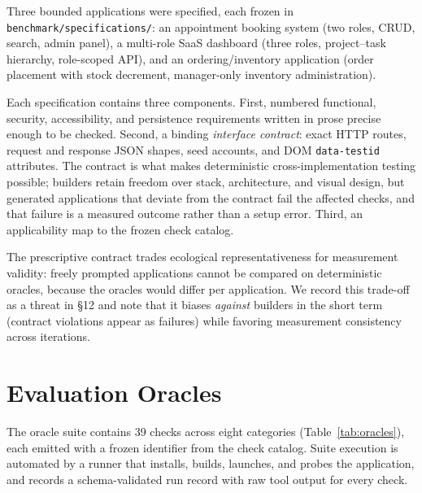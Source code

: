 Three bounded applications were specified, each frozen in
\texttt{benchmark/specifications/}: an appointment booking system (two roles, CRUD,
search, admin panel), a multi-role SaaS dashboard (three roles, project--task
hierarchy, role-scoped API), and an ordering/inventory application (order placement
with stock decrement, manager-only inventory administration).

Each specification contains three components. First, numbered functional, security,
accessibility, and persistence requirements written in prose precise enough to be
checked. Second, a binding \emph{interface contract}: exact HTTP routes, request and
response JSON shapes, seed accounts, and DOM \texttt{data-testid} attributes. The
contract is what makes deterministic cross-implementation testing possible; builders
retain freedom over stack, architecture, and visual design, but generated
applications that deviate from the contract fail the affected checks, and that
failure is a measured outcome rather than a setup error. Third, an applicability map
to the frozen check catalog.

The prescriptive contract trades ecological representativeness for measurement
validity: freely prompted applications cannot be compared on deterministic oracles,
because the oracles would differ per application. We record this trade-off as a
threat in \S12 and note that it biases \emph{against} builders in the short term
(contract violations appear as failures) while favoring measurement consistency
across iterations.

\section{Evaluation Oracles}

The oracle suite contains 39 checks across eight categories
(Table~\ref{tab:oracles}), each emitted with a frozen identifier from the check
catalog. Suite execution is automated by a runner that installs, builds, launches,
and probes the application, and records a schema-validated run record with raw tool
output for every check.

